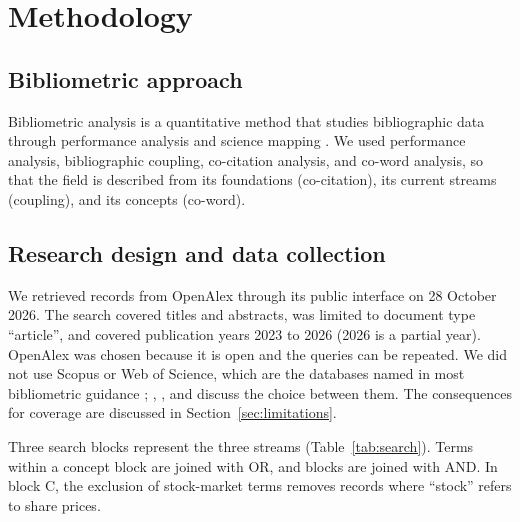 \section{Methodology}

\subsection{Bibliometric approach}
Bibliometric analysis is a quantitative method that studies bibliographic data through performance analysis and science mapping \citep{donthu2021,zupic2015}. We used performance analysis, bibliographic coupling, co-citation analysis, and co-word analysis, so that the field is described from its foundations (co-citation), its current streams (coupling), and its concepts (co-word).

\subsection{Research design and data collection}
We retrieved records from OpenAlex through its public interface on 28 October 2026.  The search covered titles and abstracts, was limited to document type ``article'', and covered publication years 2023 to 2026 (2026 is a partial year). OpenAlex was chosen because it is open and the queries can be repeated. We did not use Scopus or Web of Science, which are the databases named in most bibliometric guidance \citep{donthu2021}; \citet{zhu2020}, \citet{mongeon2016}, and \citet{echchakoui2020} discuss the choice between them. The consequences for coverage are discussed in Section~\ref{sec:limitations}.

Three search blocks represent the three streams (Table~\ref{tab:search}). Terms within a concept block are joined with OR, and blocks are joined with AND. In block C, the exclusion of stock-market terms removes records where ``stock'' refers to share prices.

